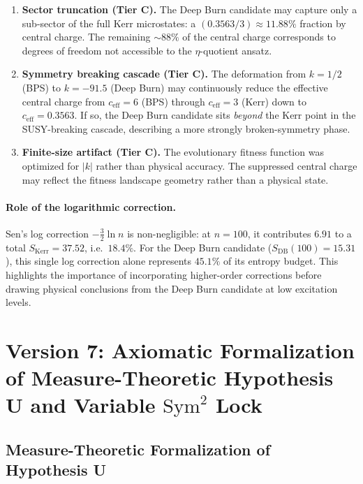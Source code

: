 \documentclass[11pt,a4paper]{article}
\theoremstyle{plain}
\theoremstyle{definition}
\theoremstyle{remark}
\newcommand{\tierC}{\textbf{Tier C}}
\begin{document}
\begin{enumerate}
  \item \textbf{Sector truncation (\tierC{}).} The Deep Burn candidate
  may capture only a sub-sector of the full Kerr microstates: a
  $(0.3563/3) \approx 11.88\%$ fraction by central charge. The remaining
  $\sim 88\%$ of the central charge corresponds to degrees of freedom
  not accessible to the $\eta$-quotient ansatz.

  \item \textbf{Symmetry breaking cascade (\tierC{}).} The deformation
  from $k = 1/2$ (BPS) to $k = -91.5$ (Deep Burn) may continuously
  reduce the effective central charge from $c_{\mathrm{eff}} = 6$ (BPS)
  through $c_{\mathrm{eff}} = 3$ (Kerr) down to $c_{\mathrm{eff}} = 0.3563$.
  If so, the Deep Burn candidate sits \emph{beyond} the Kerr point
  in the SUSY-breaking cascade, describing a more strongly
  broken-symmetry phase.

  \item \textbf{Finite-size artifact (\tierC{}).} The evolutionary
  fitness function was optimized for $|k|$ rather than physical accuracy.
  The suppressed central charge may reflect the fitness landscape geometry
  rather than a physical state.
\end{enumerate}

\paragraph{Role of the logarithmic correction.}
Sen's log correction $-\tfrac{3}{2}\ln n$ is non-negligible: at $n = 100$,
it contributes $6.91$ to a total $S_{\mathrm{Kerr}} = 37.52$, i.e.\ $18.4\%$.
For the Deep Burn candidate ($S_{\mathrm{DB}}(100) = 15.31$), this single
log correction alone represents $45.1\%$ of its entropy budget. This
highlights the importance of incorporating higher-order corrections
before drawing physical conclusions from the Deep Burn candidate at low
excitation levels.

\section{Version 7: Axiomatic Formalization of Measure-Theoretic Hypothesis U and Variable $\mathrm{Sym}^2$ Lock}\label{sec:v7}

\subsection{Measure-Theoretic Formalization of Hypothesis U}
\end{document}
